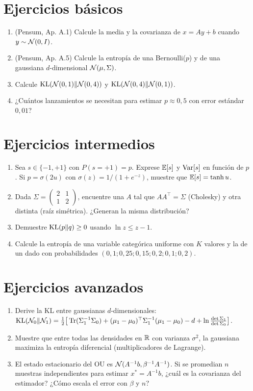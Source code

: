 \documentclass[11pt,a4paper]{article}
\begin{document}

\section{Ejercicios básicos}
\begin{enumerate}[label=\textbf{B\arabic*.}]
\item (Pensum, Ap. A.1) Calcule la media y la covarianza de $x=Ay+b$ cuando $y\sim\mathcal{N}(0,I)$.
\item (Pensum, Ap. A.5) Calcule la entropía de una Bernoulli($p$) y de una gaussiana $d$-dimensional $\mathcal{N}(\mu,\Sigma)$.
\item Calcule $\operatorname{KL}(\mathcal{N}(0,1)\|\mathcal{N}(0,4))$ y $\operatorname{KL}(\mathcal{N}(0,4)\|\mathcal{N}(0,1))$.
\item ¿Cuántos lanzamientos se necesitan para estimar $p\approx0{,}5$ con error estándar $0{,}01$?
\end{enumerate}

\section{Ejercicios intermedios}
\begin{enumerate}[label=\textbf{I\arabic*.}]
\item Sea $s\in\{-1,+1\}$ con $P(s=+1)=p$. Exprese $\mathbb{E}[s]$ y $\operatorname{Var}[s]$ en función de $p$. Si $p=\sigma(2u)$ con $\sigma(z)=1/(1+e^{-z})$, muestre que $\mathbb{E}[s]=\tanh u$.
\item Dada $\Sigma=\begin{pmatrix}2&1\\1&2\end{pmatrix}$, encuentre una $A$ tal que $AA^\top=\Sigma$ (Cholesky) y otra distinta (raíz simétrica). ¿Generan la misma distribución?
\item Demuestre $\operatorname{KL}(p\|q)\ge0$ usando $\ln z\le z-1$.
\item Calcule la entropía de una variable categórica uniforme con $K$ valores y la de un dado con probabilidades $(0{,}1;0{,}25;0{,}15;0{,}2;0{,}1;0{,}2)$.
\end{enumerate}

\section{Ejercicios avanzados}
\begin{enumerate}[label=\textbf{A\arabic*.}]
\item Derive la KL entre gaussianas $d$-dimensionales: $\operatorname{KL}(\mathcal{N}_0\|\mathcal{N}_1)=\frac12\big[\operatorname{Tr}(\Sigma_1^{-1}\Sigma_0)+(\mu_1-\mu_0)^\top\Sigma_1^{-1}(\mu_1-\mu_0)-d+\ln\frac{\det\Sigma_1}{\det\Sigma_0}\big]$.
\item Muestre que entre todas las densidades en $\mathbb{R}$ con varianza $\sigma^2$, la gaussiana maximiza la entropía diferencial (multiplicadores de Lagrange).
\item El estado estacionario del OU es $\mathcal{N}(A^{-1}b,\beta^{-1}A^{-1})$. Si se promedian $n$ muestras independientes para estimar $x^*=A^{-1}b$, ¿cuál es la covarianza del estimador? ¿Cómo escala el error con $\beta$ y $n$?
\end{enumerate}
\end{document}
